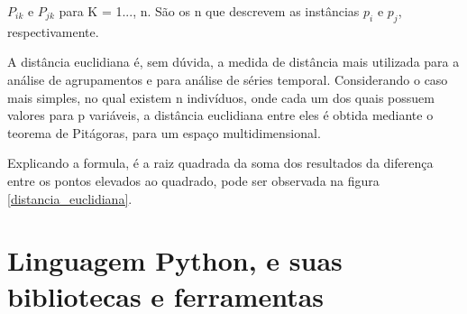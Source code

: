 \par $P_{ik}$ e $P_{jk}$ para K = 1..., n. São os n que descrevem as instâncias $p_i$ e $p_j$, respectivamente.
\par A distância euclidiana é, sem dúvida, a medida de distância mais utilizada para a análise de agrupamentos e para análise de séries temporal. Considerando o caso mais simples, no qual existem n indivíduos, onde cada um dos quais possuem valores para p variáveis, a distância euclidiana entre eles é obtida mediante o teorema de Pitágoras, para um espaço multidimensional.
\par Explicando a formula, é a raiz quadrada da soma dos resultados da diferença entre os pontos elevados ao quadrado, pode ser observada na figura \ref{distancia_euclidiana}. 

\section{Linguagem Python, e suas bibliotecas e ferramentas}

